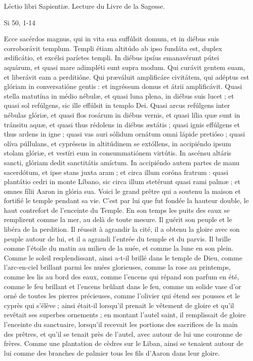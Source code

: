 \begin{paracol}{2}
Léctio libri Sapientiæ.
\switchcolumn
Lecture du Livre de la Sagesse.
\switchcolumn*

Si 50, 1-14
\switchcolumn

\switchcolumn*

Ecce sacérdos magnus, qui in vita  sua suffúlsit domum, et in diébus suis corroborávit templum. Templi étiam altitúdo ab ipso fundáta est, duplex ædificátio, et excélsi paríetes templi. In diébus ipsíus emanavérunt pútei aquárum, et quasi mare adimpléti sunt supra modum. Qui curávit gentem suam, et liberávit eam a perditióne. Qui præváluit amplificáre civitátem, qui adéptus est glóriam in conversatióne gentis : et ingréssum domus et átrii amplificávit. Quasi stella matutína in médio nébulæ, et quasi luna plena, in diébus suis lucet ; et quasi sol refúlgens, sic ille effúlsit in templo Dei. Quasi arcus refúlgens inter nébulas glóriæ, et quasi flos rosárum in diébus vernis, et quasi lília quæ sunt in tránsitu aquæ, et quasi thus rédolens in diébus æstátis ; quasi ignis effúlgens et thus ardens in igne ; quasi vas auri sólidum ornátum omni lápide pretióso ; quasi olíva púllulans, et cypréssus in altitúdinem se extóllens, in accipiéndo ipsum stolam glóriæ, et vestíri eum in consummatiónem virtútis. In ascénsu altáris sancti, glóriam dedit sanctitátis amíctum. In accipiéndo autem partes de manu sacerdótum, et ipse stans juxta aram ; et circa illum coróna fratrum : quasi plantátio cedri in monte Líbano, sic circa illum stetérunt quasi rami palmæ ; et omnes fílii Aaron in glória sua.
\switchcolumn
Voici le grand prêtre qui a soutenu la  maison et fortifié le temple pendant sa vie. C’est par lui que fut fondée la hauteur double, le haut contrefort de l’enceinte du Temple. En son temps  les puits des eaux se remplirent comme la mer, au delà de toute mesure. Il guérit son peuple et le libéra de la perdition. Il réussit à agrandir la cité, il a obtenu la gloire avec son peuple autour de lui, et il a agrandi l’entrée du temple et du parvis. Il brille comme l’étoile du matin au milieu de la nuée, et comme la lune en son plein. Comme le soleil resplendissant, ainsi a-t-il brillé dans le temple de Dieu, comme l’arc-en-ciel brillant parmi les nuées glorieuses, comme la rose au printemps, comme les lis au bord des eaux, comme l’encens qui répand son parfum en été, comme le feu brillant et l’encens brûlant dans le feu, comme un solide vase d’or orné de toutes les pierres précieuses, comme l’olivier qui étend ses pousses et le cyprès qui s’élève ; ainsi était-il lorsqu’il prenait le vêtement de gloire et qu’il revêtait ses superbes ornements ; en montant l’autel saint, il remplissait de gloire l’enceinte du sanctuaire, lorsqu’il recevait les portions des sacrifices de la main des prêtres, et qu’il se tenait près de l’autel, avec autour de lui une couronne de frères. Comme une plantation de cèdres sur le Liban, ainsi se tenaient autour de lui comme des branches de palmier tous les fils d’Aaron dans leur gloire.
\switchcolumn*


\end{paracol}

